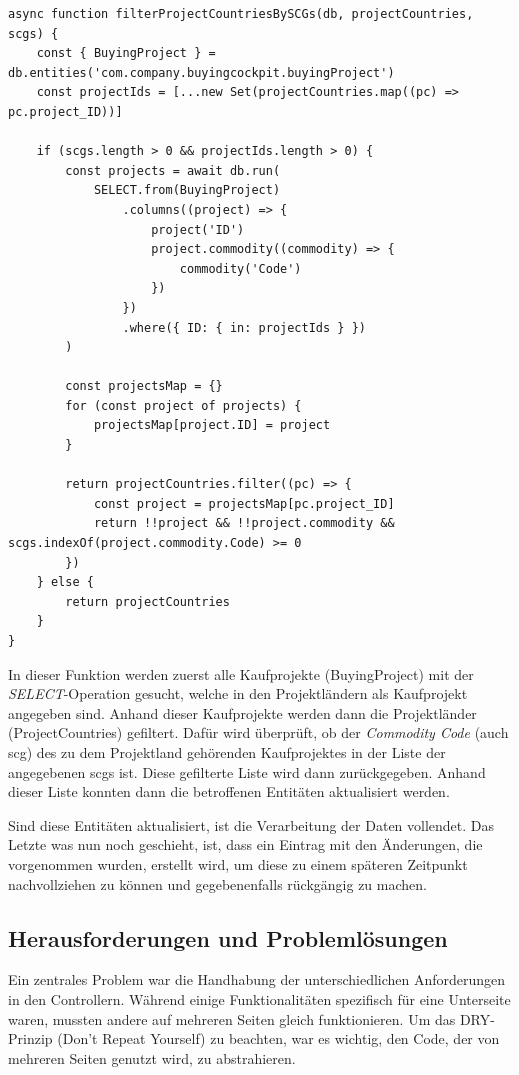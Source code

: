 \begin{lstlisting}[caption={\gls{scg} Filterfunktion für Projektländer}]
async function filterProjectCountriesBySCGs(db, projectCountries, scgs) {
    const { BuyingProject } = db.entities('com.company.buyingcockpit.buyingProject')
    const projectIds = [...new Set(projectCountries.map((pc) => pc.project_ID))]

    if (scgs.length > 0 && projectIds.length > 0) {
        const projects = await db.run(
            SELECT.from(BuyingProject)
                .columns((project) => {
                    project('ID')
                    project.commodity((commodity) => {
                        commodity('Code')
                    })
                })
                .where({ ID: { in: projectIds } })
        )

        const projectsMap = {}
        for (const project of projects) {
            projectsMap[project.ID] = project
        }

        return projectCountries.filter((pc) => {
            const project = projectsMap[pc.project_ID]
            return !!project && !!project.commodity && scgs.indexOf(project.commodity.Code) >= 0
        })
    } else {
        return projectCountries
    }
}
\end{lstlisting}

In dieser Funktion werden zuerst alle Kaufprojekte (BuyingProject) mit der \textit{SELECT}-Operation gesucht, welche in den Projektländern als Kaufprojekt angegeben sind.
Anhand dieser Kaufprojekte werden dann die Projektländer (ProjectCountries) gefiltert.
Dafür wird überprüft, ob der \textit{Commodity Code} (auch \gls{scg}) des zu dem Projektland gehörenden Kaufprojektes in der Liste der angegebenen \glspl{scg} ist.
Diese gefilterte Liste wird dann zurückgegeben.
Anhand dieser Liste konnten dann die betroffenen Entitäten aktualisiert werden.

Sind diese Entitäten aktualisiert, ist die Verarbeitung der Daten vollendet.
Das Letzte was nun noch geschieht, ist, dass ein Eintrag mit den Änderungen, die vorgenommen wurden, erstellt wird, um diese zu einem späteren Zeitpunkt nachvollziehen zu können und gegebenenfalls rückgängig zu machen.


\subsection[Herausforderungen und Problemlösungen]{Herausforderungen und Problemlösungen}

Ein zentrales Problem war die Handhabung der unterschiedlichen Anforderungen in den Controllern.
Während einige Funktionalitäten spezifisch für eine Unterseite waren, mussten andere auf mehreren Seiten gleich funktionieren.
Um das DRY-Prinzip (Don't Repeat Yourself) zu beachten, war es wichtig, den Code, der von mehreren Seiten genutzt wird, zu abstrahieren.

